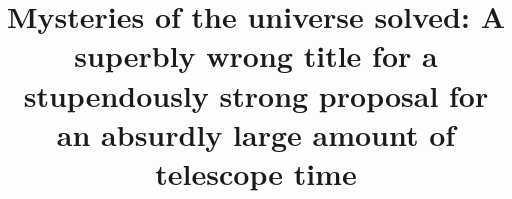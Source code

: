 \documentclass{lowell-prop}
\begin{document}

%
\title{Mysteries of the universe solved: A superbly wrong title for a stupendously strong proposal for an absurdly large amount of telescope time}


%
%
%
%
%

\begin{PI}
\end{PI}

\begin{CoI}
\end{CoI}
\end{document}
